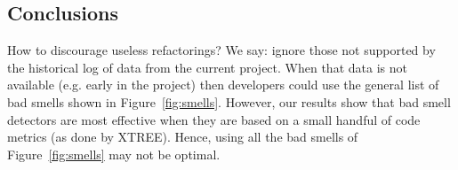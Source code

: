 \documentclass[twocolumn,5p]{elsarticle}
\newcommand{\fig}[1]{Figure~\ref{fig:#1}}
\theoremstyle{break}
\begin{document}
\begin{itemize}

  








% 


\section{Conclusions}
How to discourage useless refactorings?
We say: ignore those not supported by the historical log of data from
the current project.  
When that data is not available (e.g. early
in the project) then developers could use the general list of
bad smells shown in \fig{smells}. However, 
our results
show that  bad smell detectors are most
effective when they are based
on a small handful of code metrics (as done by XTREE).
Hence, using all the bad smells of \fig{smells} may not be optimal. 


\end{itemize}
\end{document}
